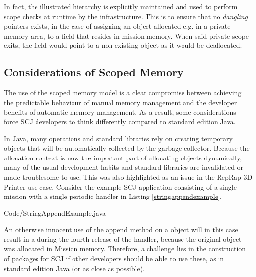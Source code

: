 
In fact, the illustrated hierarchy is explicitly maintained and used to perform scope checks at runtime by the infrastructure. This is to ensure that no \textit{dangling} pointers exists, in the case of assigning an object allocated e.g. in a private memory area, to a field that resides in mission memory\cite{Schoeberl:2011:MMS:2043910.2043919}. When said private scope exits, the field would point to a non-existing object as it would be deallocated.


\subsection{Considerations of Scoped Memory} %
\label{sub:considerations_of_scoped_memory}
The use of the scoped memory model is a clear compromise between achieving the predictable behaviour of manual memory management and the developer benefits of automatic memory management. As a result, some considerations force SCJ developers to think differently compared to standard edition Java.

In Java, many operations and standard libraries rely on creating temporary objects that will be automatically collected by the garbage collector. Because the allocation context is now the important part of allocating objects dynamically, many of the usual development habits and standard libraries are invalidated or made troublesome to use. This was also highlighted as an issue in the RepRap 3D Printer use case\cite{Schoeberl:2012:RepRap}. Consider the example SCJ application consisting of a single mission with a single periodic handler in Listing \ref{stringappendexample}. 


{Code/StringAppendExample.java}

An otherwise innocent use of the append method on a  object will in this case result in a  during the fourth release of the handler, because the original  object was allocated in Mission memory. Therefore, a challenge lies in the construction of packages for SCJ if other developers should be able to use these, as in standard edition Java (or as close as possible).

